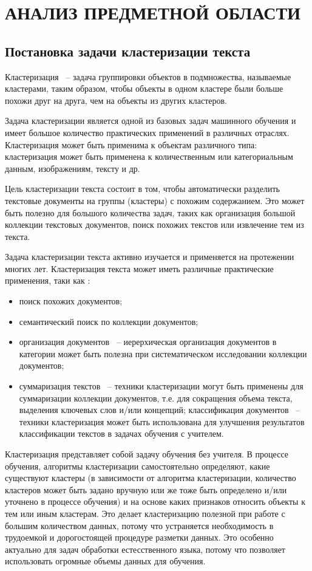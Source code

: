 \chapter{АНАЛИЗ ПРЕДМЕТНОЙ ОБЛАСТИ}
\aftertitle

\section{Постановка задачи кластеризации текста}

Кластеризация ~-- задача группировки объектов в подмножества, называемые кластерами, таким образом, чтобы объекты в одном кластере были больше похожи друг на друга, чем на объекты из других кластеров.

Задача кластеризации является одной из базовых задач машинного обучения и имеет большое количество практических применений в различных отраслях. Кластеризация может быть применима к объектам различного типа: кластеризация может быть применена к количественным или категориальным данным, изображениям, тексту и др.

Цель кластеризации текста состоит в том, чтобы автоматически разделить текстовые документы на группы (кластеры) с похожим содержанием. Это может быть полезно для большого количества задач, таких как организация большой коллекции текстовых документов, поиск похожих текстов или извлечение тем из текста.

Задача кластеризации текста активно изучается и применяется на протежении многих лет. Кластеризация текста может иметь различные практические применения, таки как \cite{text-clustering-survey}:
\begin{itemize}
    \item поиск похожих документов;
    \item семантический поиск по коллекции документов;
    \item организация документов ~-- иерерхическая организация документов в категории может быть полезна при систематическом исследовании коллекции документов;
    \item суммаризация текстов ~-- техники кластеризации могут быть применены для суммаризации коллекции документов, т.е. для сокращения объема текста, выделения ключевых слов и/или концепций;
     классификация документов ~-- техники кластеризация может быть использована для улучшения результатов классификации текстов в задачах обучения с учителем.
\end{itemize}

Кластеризация представляет собой задачу обучения без учителя. В процессе обучения, алгоритмы кластеризации самостоятельно определяют, какие существуют кластеры (в зависимости от алгоритма кластеризации, количество кластеров может быть задано вручную или же тоже быть определено и/или уточнено в процессе обучения) и на основе каких признаков относить объекты к тем или иным кластерам. Это делает кластеризацию полезной при работе с большим количеством данных, потому что устраняется необходимость в трудоемкой и дорогостоящей процедуре разметки данных. Это особенно актуально для задач обработки естесственного языка, потому что позволяет использовать огромные объемы данных для обучения.

